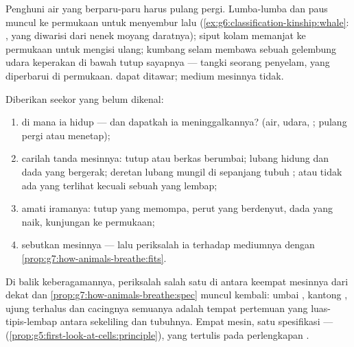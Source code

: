 \begin{example}\label{ex:g7:how-animals-breathe:airinwater}
Penghuni air yang berparu-paru harus pulang pergi. Lumba-lumba dan
paus muncul ke permukaan untuk menyembur lalu 
(\cref{ex:g6:classification-kinship:whale}:  , yang
diwarisi dari nenek moyang daratnya); siput kolam memanjat ke
permukaan untuk mengisi ulang; kumbang selam membawa sebuah gelembung
udara keperakan di bawah tutup sayapnya --- tangki seorang penyelam,
yang diperbarui di permukaan.  dapat ditawar; medium mesinnya
tidak.
\end{example}

\begin{method}\label{met:g7:how-animals-breathe:read}
Diberikan seekor  yang belum dikenal:
\begin{enumerate}
  \item di mana ia hidup --- dan dapatkah ia meninggalkannya? (air,
        udara, ; pulang pergi atau menetap);
  \item carilah tanda mesinnya: tutup  atau berkas berumbai;
        lubang hidung dan dada yang bergerak; deretan lubang mungil di
        sepanjang tubuh ; atau tidak ada yang terlihat kecuali
        sebuah  yang lembap;
  \item amati iramanya: tutup yang memompa, perut yang berdenyut, dada
        yang naik, kunjungan ke permukaan;
  \item sebutkan mesinnya --- lalu periksalah ia terhadap mediumnya
        dengan
        \cref{prop:g7:how-animals-breathe:fits}.
\end{enumerate}
\end{method}

\begin{remark}\label{rem:g7:how-animals-breathe:same}
Di balik keberagamannya, periksalah salah satu di antara keempat
mesinnya dari dekat dan \cref{prop:g7:how-animals-breathe:spec} muncul
kembali: umbai , kantong , ujung terhalus
 dan  cacingnya semuanya adalah tempat pertemuan yang
luas-tipis-lembap antara sekeliling dan tubuhnya. Empat mesin, satu
spesifikasi --- 
(\cref{prop:g5:first-look-at-cells:principle}), yang tertulis pada
perlengkapan .
\end{remark}

